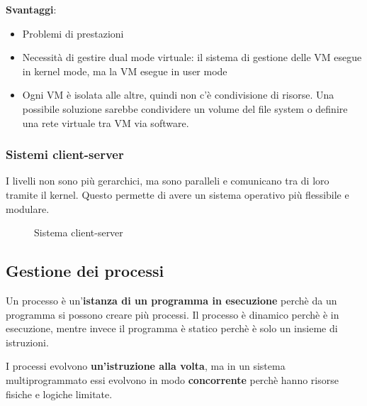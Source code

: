 \documentclass[a4paper]{article}
\begin{document}
\noindent
\textbf{Svantaggi}:
\begin{itemize}
  \item Problemi di prestazioni
  \item Necessità di gestire dual mode virtuale: il sistema di gestione delle VM esegue
    in kernel mode, ma la VM esegue in user mode
  \item Ogni VM è isolata alle altre, quindi non c'è condivisione di risorse. Una 
    possibile soluzione sarebbe condividere un volume del file system o definire una rete
    virtuale tra VM via software.
\end{itemize}

\subsubsection{Sistemi client-server}
I livelli non sono più gerarchici, ma sono paralleli e comunicano tra di loro tramite
il kernel. Questo permette di avere un sistema operativo più flessibile e modulare.
\begin{figure}[H]
  \centering
  \caption{Sistema client-server}
\end{figure}

\subsection{Gestione dei processi}
Un processo è un'\textbf{istanza di un programma in esecuzione} perchè da un programma
si possono creare più processi. Il processo è dinamico perchè è in esecuzione, mentre
invece il programma è statico perchè è solo un insieme di istruzioni.

\noindent
I processi evolvono \textbf{un'istruzione alla volta}, ma in un sistema multiprogrammato
essi evolvono in modo \textbf{concorrente} perchè hanno risorse fisiche e logiche limitate.
\end{document}
